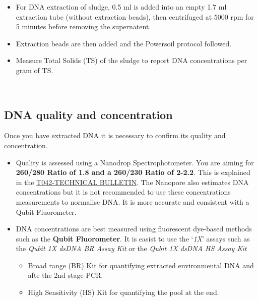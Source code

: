 \documentclass[
]{book}
\providecommand{\tightlist}{%
  \setlength{\itemsep}{0pt}\setlength{\parskip}{0pt}}
\begin{document}
\begin{itemize}
\tightlist
\item
  For DNA extraction of sludge, 0.5 ml is added into an empty 1.7 ml extraction tube (without extraction beads), then centrifuged at 5000 rpm for 5 minutes before removing the supernatent.
\item
  Extraction beads are then added and the Powersoil protocol followed.
\item
  Measure Total Solids (TS) of the sludge to report DNA concentrations per gram of TS.\\
  \strut \\
\end{itemize}

\hypertarget{dna-quality-and-concentration}{%
\subsection{DNA quality and concentration}\label{dna-quality-and-concentration}}

Once you have extracted DNA it is necessary to confirm its quality and concentration.

\begin{itemize}
\tightlist
\item
  Quality is assessed using a Nanodrop Spectrophotometer. You are aiming for \textbf{260/280 Ratio of 1.8 and a 260/230 Ratio of 2-2.2}. This is explained in the \href{https://dna.uga.edu/wp-content/uploads/sites/51/2019/02/Note-on-the-260_280-and-260_230-Ratios.pdf}{T042‐TECHNICAL BULLETIN}. The Nanopore also estimates DNA concentrations but it is not recommended to use these concentrations measurements to normalise DNA. It is more accurate and consistent with a Qubit Fluorometer.\\
\item
  DNA concentrations are best measured using fluorescent dye-based methods such as the \textbf{Qubit Fluorometer}. It is easist to use the `\emph{1X}' assays such as the \emph{Qubit 1X dsDNA BR Assay Kit} or the \emph{Qubit 1X dsDNA HS Assay Kit}

  \begin{itemize}
  \tightlist
  \item
    Broad range (BR) Kit for quantifying extracted environmental DNA and afte the 2nd stage PCR.
  \item
    High Sensitivity (HS) Kit for quantifying the pool at the end.
  \end{itemize}
\end{itemize}
\end{document}
